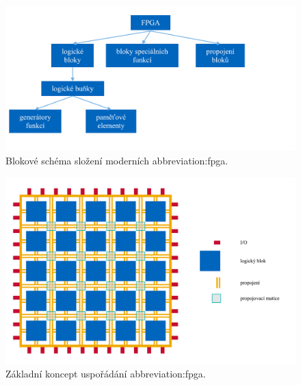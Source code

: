 \documentclass[a4paper, twoside, 11pt]{article}
\newcommand{\fbar}{\FloatBarrier}
\begin{document}
		\begin{figure}[htbp!]
			\centering
				\includegraphics[width=1\textwidth]{src/pdf/fpga-skladba.pdf} 
				\caption{Blokové schéma složení moderních \gls{abbreviation:fpga}.}
				\label{fig:fpga-skladba}
		\end{figure}


		\begin{figure}[htbp!]
			\centering
				\includegraphics[width=1\textwidth]{src/pdf/fpga-general-design.pdf} 
				\caption{Základní koncept uspořádání \gls{abbreviation:fpga}.}
				\label{fig:fpga-general-design}
		\end{figure}

		\fbar
\end{document}
